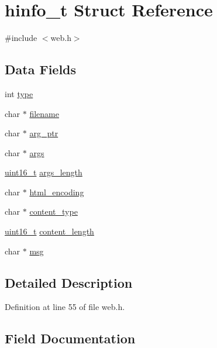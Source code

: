 \hypertarget{structhinfo__t}{}\section{hinfo\+\_\+t Struct Reference}
\label{structhinfo__t}


{\ttfamily \#include $<$web.\+h$>$}

\subsection*{Data Fields}
\begin{DoxyCompactItemize}
\item 
int \hyperlink{structhinfo__t_a4e896141431943909a71282fc56799fb}{type}
\item 
char $\ast$ \hyperlink{structhinfo__t_a874ffdf5ade4e3844d7719444495e89c}{filename}
\item 
char $\ast$ \hyperlink{structhinfo__t_a0d27c1b7d2730373f93342961b9cb18d}{arg\+\_\+ptr}
\item 
char $\ast$ \hyperlink{structhinfo__t_a62bf198b939a9d932bcac763ebc51443}{args}
\item 
\hyperlink{send_8c_a273cf69d639a59973b6019625df33e30}{uint16\+\_\+t} \hyperlink{structhinfo__t_a003130c9489dfe54a76df23a85fae62f}{args\+\_\+length}
\item 
char $\ast$ \hyperlink{structhinfo__t_ac03bcdde52e49a14bf9112f295f216b5}{html\+\_\+encoding}
\item 
char $\ast$ \hyperlink{structhinfo__t_a87bad5ce6af7ed3613a61d01aef94d8d}{content\+\_\+type}
\item 
\hyperlink{send_8c_a273cf69d639a59973b6019625df33e30}{uint16\+\_\+t} \hyperlink{structhinfo__t_a6cf5714c0fe8e8e7f7819194274f9052}{content\+\_\+length}
\item 
char $\ast$ \hyperlink{structhinfo__t_a06469570091ad74724457998e07d5b56}{msg}
\end{DoxyCompactItemize}


\subsection{Detailed Description}


Definition at line 55 of file web.\+h.



\subsection{Field Documentation}
